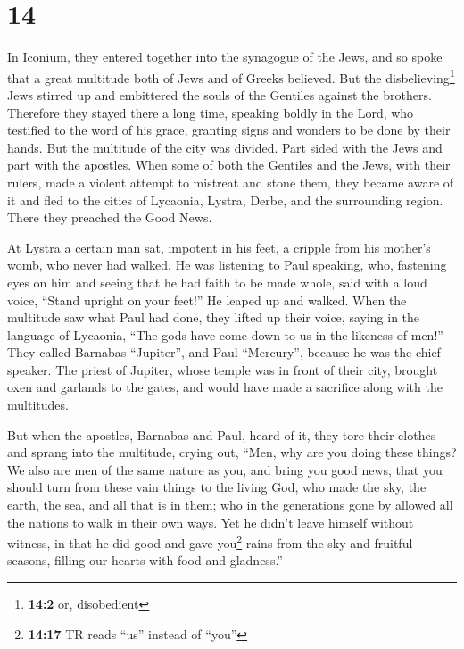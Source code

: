 \hypertarget{section-13}{%
\section{14}\label{section-13}}

 In Iconium, they entered together into the synagogue of
the Jews, and so spoke that a great multitude both of Jews and of Greeks
believed.  But the disbelieving\footnote{\textbf{14:2} or,
  disobedient} Jews stirred up and embittered the souls of the Gentiles
against the brothers.  Therefore they stayed there a long
time, speaking boldly in the Lord, who testified to the word of his
grace, granting signs and wonders to be done by their hands.
 But the multitude of the city was divided. Part sided
with the Jews and part with the apostles.  When some of
both the Gentiles and the Jews, with their rulers, made a violent
attempt to mistreat and stone them,  they became aware of
it and fled to the cities of Lycaonia, Lystra, Derbe, and the
surrounding region.  There they preached the Good News.

 At Lystra a certain man sat, impotent in his feet, a
cripple from his mother's womb, who never had walked.  He
was listening to Paul speaking, who, fastening eyes on him and seeing
that he had faith to be made whole,  said with a loud
voice, ``Stand upright on your feet!'' He leaped up and walked.
 When the multitude saw what Paul had done, they lifted
up their voice, saying in the language of Lycaonia, ``The gods have come
down to us in the likeness of men!''  They called
Barnabas ``Jupiter'', and Paul ``Mercury'', because he was the chief
speaker.  The priest of Jupiter, whose temple was in
front of their city, brought oxen and garlands to the gates, and would
have made a sacrifice along with the multitudes.

 But when the apostles, Barnabas and Paul, heard of it,
they tore their clothes and sprang into the multitude, crying out,
 ``Men, why are you doing these things? We also are men
of the same nature as you, and bring you good news, that you should turn
from these vain things to the living God, who made the sky, the earth,
the sea, and all that is in them;  who in the generations
gone by allowed all the nations to walk in their own ways.
 Yet he didn't leave himself without witness, in that he
did good and gave you\footnote{\textbf{14:17} TR reads ``us'' instead of
  ``you''} rains from the sky and fruitful seasons, filling our hearts
with food and gladness.''


